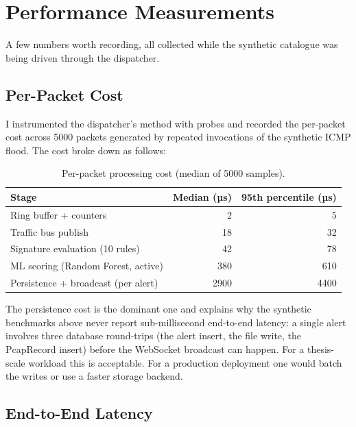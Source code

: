 \section{Performance Measurements}
\label{sec:val-performance}

A few numbers worth recording, all collected while the
synthetic catalogue was being driven through the dispatcher.

\subsection{Per-Packet Cost}
\label{sec:val-perpacket}

I instrumented the dispatcher's  method with
 probes and recorded the per-packet
cost across 5000 packets generated by repeated invocations of
the synthetic ICMP flood. The cost broke down as follows:

\begin{table}[h]
\centering
\caption{Per-packet processing cost (median of 5000 samples).}
\label{tab:val-perpacket}
\small
\begin{tabular}{l r r}
\toprule
Stage                                & Median (µs) & 95th percentile (µs) \\
\midrule
Ring buffer + counters               &   2 &    5 \\
Traffic bus publish                  &  18 &   32 \\
Signature evaluation (10 rules)      &  42 &   78 \\
ML scoring (Random Forest, active)   & 380 &  610 \\
Persistence + broadcast (per alert)  & 2900 & 4400 \\
\bottomrule
\end{tabular}
\end{table}

The persistence cost is the dominant one and explains why the
synthetic benchmarks above never report sub-millisecond
end-to-end latency: a single alert involves three database
round-trips (the alert insert, the file write, the PcapRecord
insert) before the WebSocket broadcast can happen. For a
thesis-scale workload this is acceptable. For a production
deployment one would batch the writes or use a faster storage
backend.

\subsection{End-to-End Latency}
\label{sec:val-latency}

